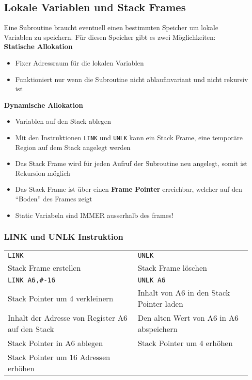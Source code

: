\subsection{Lokale Variablen und Stack Frames}
Eine Subroutine braucht eventuell einen bestimmten Speicher um lokale Variablen zu speichern. Für diesen Speicher gibt es zwei Möglichkeiten: \\
\textbf{Statische Allokation}
\begin{itemize}
  \item Fixer Adressraum für die lokalen Variablen
  \item Funktioniert nur wenn die Subroutine nicht ablaufinvariant und nicht rekursiv ist
\end{itemize}
\textbf{Dynamische Allokation}
\begin{itemize}
  \item Variablen auf den Stack ablegen
  \item Mit den Instruktionen \verb+LINK+ und \verb+UNLK+ kann ein Stack Frame, eine temporäre Region auf dem Stack angelegt werden
  \item Das Stack Frame wird für jeden Aufruf der Subroutine neu angelegt, somit ist Rekursion möglich
  \item Das Stack Frame ist über einen \textbf{Frame Pointer} erreichbar,
  welcher auf den "`Boden"' des Frames zeigt
  \item Static Variabeln sind IMMER ausserhalb des frames! 
\end{itemize}


\subsubsection{LINK und UNLK Instruktion}
\begin{tabular}{l|l}
	\verb+LINK+											& \verb+UNLK+ \\
	Stack Frame erstellen								& Stack Frame löschen \\
	\hline
	\verb+LINK A6,#-16+									& \verb+UNLK A6+ \\
	Stack Pointer um 4 verkleinern						& Inhalt von A6 in den Stack Pointer laden \\
	Inhalt der Adresse von Register A6 auf den Stack	& Den alten Wert von A6 in A6 abspeichern \\
	Stack Pointer in A6 ablegen							& Stack Pointer um 4 erhöhen \\
	Stack Pointer um 16 Adressen erhöhen				& 
\end{tabular}